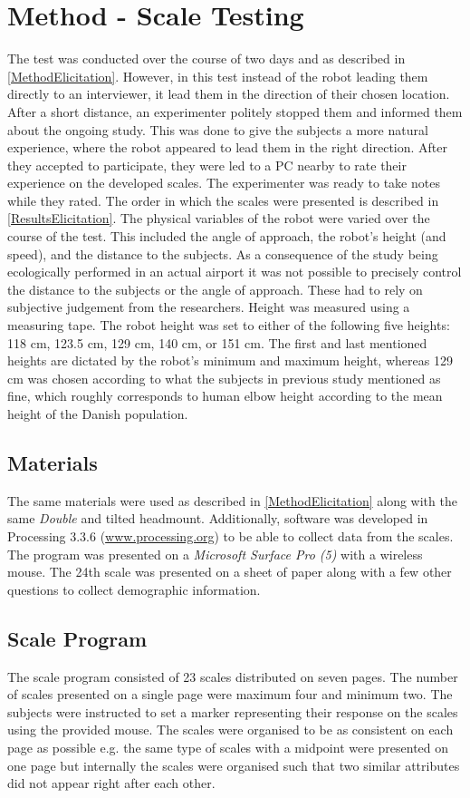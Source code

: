 \section{Method - Scale Testing}
\label{Method2}
The test was conducted over the course of two days and as described in \autoref{MethodElicitation}. However, in this test instead of the robot leading them directly to an interviewer, it lead them in the direction of their chosen location. After a short distance, an experimenter politely stopped them and informed them about the ongoing study. This was done to give the subjects a more natural experience, where the robot appeared to lead them in the right direction. After they accepted to participate, they were led to a PC nearby to rate their experience on the developed scales. The experimenter was ready to take notes while they rated. The order in which the scales were presented is described in \autoref{ResultsElicitation}. The physical variables of the robot were varied over the course of the test. This included the angle of approach, the robot's height (and speed), and the distance to the subjects. As a consequence of the study being ecologically performed in an actual airport it was not possible to precisely control the distance to the subjects or the angle of approach. These had to rely on subjective judgement from the researchers. Height was measured using a measuring tape. The robot height was set to either of the following five heights: 118 cm, 123.5 cm, 129 cm, 140 cm, or 151 cm. The first and last mentioned heights are dictated by the robot's minimum and maximum height, whereas 129 cm was chosen according to what the subjects in previous study mentioned as fine, which roughly corresponds to human elbow height according to the mean height of the Danish population. 

\subsection{Materials}
The same materials were used as described in \autoref{MethodElicitation} along with the same \textit{Double} and tilted headmount. Additionally, software was developed in Processing 3.3.6 (\url{www.processing.org}) to be able to collect data from the scales. The program was presented on a \textit{Microsoft Surface Pro (5)} with a wireless mouse. The 24th scale was presented on a sheet of paper along with a few other questions to collect demographic information.

\subsection{Scale Program}
The scale program consisted of 23 scales distributed on seven pages. The number of scales presented on a single page were maximum four and minimum two. The subjects were instructed to set a marker representing their response on the scales using the provided mouse. The scales were organised to be as consistent on each page as possible e.g. the same type of scales with a midpoint were presented on one page but internally the scales were organised such that two similar attributes did not appear right after each other.

